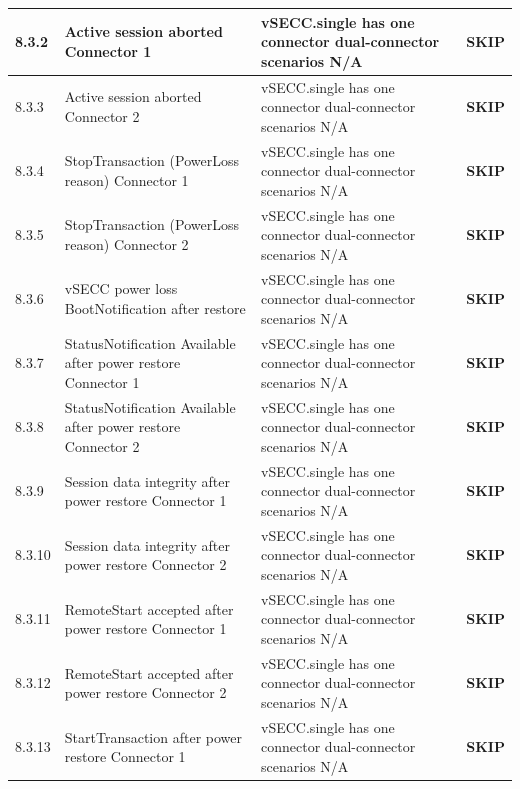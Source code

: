 \documentclass[10pt, a4paper]{article}
\begin{document}
\begin{longtable}{|L{1cm}|L{5.5cm}|M{7cm}|C{1.8cm}|}
\hline
\small 8.3.2 & \small Active session aborted  Connector 1 & vSECC.single has one connector  dual-connector scenarios N/A & \textcolor{skipgray}{\textbf{SKIP}} \\
\hline
\small 8.3.3 & \small Active session aborted  Connector 2 & vSECC.single has one connector  dual-connector scenarios N/A & \textcolor{skipgray}{\textbf{SKIP}} \\
\hline
\small 8.3.4 & \small StopTransaction (PowerLoss reason)  Connector 1 & vSECC.single has one connector  dual-connector scenarios N/A & \textcolor{skipgray}{\textbf{SKIP}} \\
\hline
\small 8.3.5 & \small StopTransaction (PowerLoss reason)  Connector 2 & vSECC.single has one connector  dual-connector scenarios N/A & \textcolor{skipgray}{\textbf{SKIP}} \\
\hline
\small 8.3.6 & \small vSECC power loss BootNotification after restore & vSECC.single has one connector  dual-connector scenarios N/A & \textcolor{skipgray}{\textbf{SKIP}} \\
\hline
\small 8.3.7 & \small StatusNotification Available after power restore  Connector 1 & vSECC.single has one connector  dual-connector scenarios N/A & \textcolor{skipgray}{\textbf{SKIP}} \\
\hline
\small 8.3.8 & \small StatusNotification Available after power restore  Connector 2 & vSECC.single has one connector  dual-connector scenarios N/A & \textcolor{skipgray}{\textbf{SKIP}} \\
\hline
\small 8.3.9 & \small Session data integrity after power restore  Connector 1 & vSECC.single has one connector  dual-connector scenarios N/A & \textcolor{skipgray}{\textbf{SKIP}} \\
\hline
\small 8.3.10 & \small Session data integrity after power restore  Connector 2 & vSECC.single has one connector  dual-connector scenarios N/A & \textcolor{skipgray}{\textbf{SKIP}} \\
\hline
\small 8.3.11 & \small RemoteStart accepted after power restore  Connector 1 & vSECC.single has one connector  dual-connector scenarios N/A & \textcolor{skipgray}{\textbf{SKIP}} \\
\hline
\small 8.3.12 & \small RemoteStart accepted after power restore  Connector 2 & vSECC.single has one connector  dual-connector scenarios N/A & \textcolor{skipgray}{\textbf{SKIP}} \\
\hline
\small 8.3.13 & \small StartTransaction after power restore  Connector 1 & vSECC.single has one connector  dual-connector scenarios N/A & \textcolor{skipgray}{\textbf{SKIP}} \\

\end{longtable}
\end{document}
